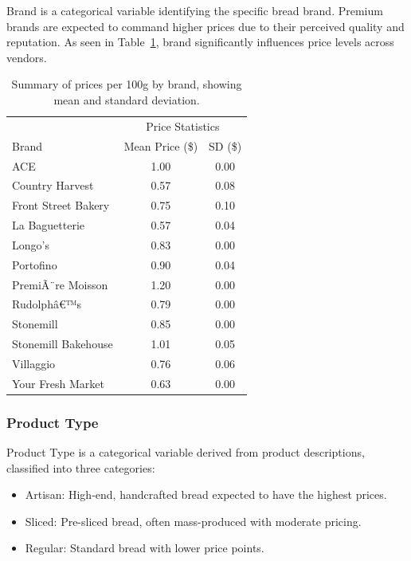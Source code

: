 \documentclass[
  letterpaper,
  DIV=11,
  numbers=noendperiod]{scrartcl}
\begin{document}
Brand is a categorical variable identifying the specific bread brand.
Premium brands are expected to command higher prices due to their
perceived quality and reputation. As seen in
Table~\ref{tbl-brand-summary}, brand significantly influences price
levels across vendors.

\begin{longtable}[t]{lcc}

\caption{\label{tbl-brand-summary}Summary of prices per 100g by brand,
showing mean and standard deviation.}

\tabularnewline

\toprule
\multicolumn{1}{c}{ } & \multicolumn{2}{c}{Price Statistics} \\
\cmidrule(l{3pt}r{3pt}){2-3}
Brand & Mean Price (\$) & SD (\$)\\
\midrule
ACE & 1.00 & 0.00\\
Country Harvest & 0.57 & 0.08\\
Front Street Bakery & 0.75 & 0.10\\
La Baguetterie & 0.57 & 0.04\\
Longo's & 0.83 & 0.00\\
\addlinespace
Portofino & 0.90 & 0.04\\
PremiÃ¨re Moisson & 1.20 & 0.00\\
Rudolphâ€™s & 0.79 & 0.00\\
Stonemill & 0.85 & 0.00\\
Stonemill Bakehouse & 1.01 & 0.05\\
\addlinespace
Villaggio & 0.76 & 0.06\\
Your Fresh Market & 0.63 & 0.00\\
\bottomrule

\end{longtable}

\subsubsection{Product Type}\label{product-type}

Product Type is a categorical variable derived from product
descriptions, classified into three categories:

\begin{itemize}
\item
  Artisan: High-end, handcrafted bread expected to have the highest
  prices.
\item
  Sliced: Pre-sliced bread, often mass-produced with moderate pricing.
\item
  Regular: Standard bread with lower price points.
\end{itemize}
\end{document}

